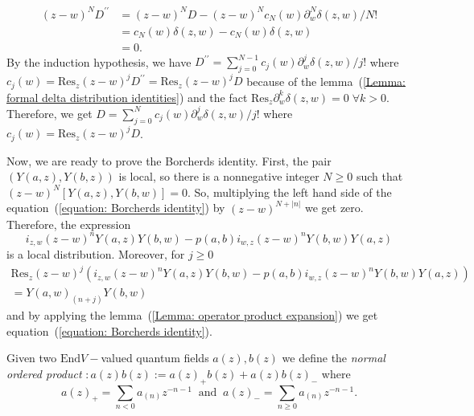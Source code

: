 \begin{equation}
\begin{split}
    (z-w)^ND^{\prime\prime} &= (z-w)^ND-(z-w)^N c_N(w)\partial_w^N\delta(z,w)/N!\\
    &=c_N(w)\delta(z,w)-c_N(w)\delta(z,w)\\
    &=0.
\end{split}
\end{equation}
By the induction hypothesis, we have $D^{\prime\prime}=\sum_{j=0}^{N-1}c_j(w)\partial_w^j\delta(z,w)/j!$ where $c_j(w)=\text{Res}_z(z-w)^jD^{\prime\prime} = \text{Res}_z(z-w)^jD$ because of the lemma~(\ref{Lemma: formal delta distribution identities}) and the fact $\text{Res}_z\partial_w^k\delta(z,w)=0\;\forall k>0$. Therefore, we get $D=\sum_{j=0}^Nc_j(w)\partial_w^j\delta(z,w)/j!$ where $c_j(w)=\text{Res}_z(z-w)^jD$.\par
Now, we are ready to prove the Borcherds identity. First, the pair $(Y(a,z),Y(b,z))$ is local, so there is a nonnegative integer $N\geq0$ such that $(z-w)^N[Y(a,z),Y(b,w)]=0$. So, multiplying the left hand side of the equation~(\ref{equation: Borcherds identity}) by $(z-w)^{N+|n|}$ we get zero. Therefore, the expression 
\begin{equation}
    i_{z,w}(z-w)^nY(a,z)Y(b,w)-p(a,b)i_{w,z}(z-w)^nY(b,w)Y(a,z)
\end{equation}
is a local distribution. Moreover, for $j\geq0$
\begin{equation}
\begin{split}
    \text{Res}_z(z-w)^j(i_{z,w}(z-w)^nY(a,z)Y(b,w)-p(a,b)i_{w,z}(z-w)^nY(b,w)Y(a,z))\\
    =Y(a,w)_{(n+j)}Y(b,w)
\end{split}
\end{equation}
and by applying the lemma~(\ref{Lemma: operator product expansion}) we get equation~(\ref{equation: Borcherds identity}).\par
\begin{dang}
    \begin{definition}\label{Definition: normal ordered product between fields}\cite{de2006finite}
        Given two $\text{End}V-$valued quantum fields $a(z), b(z)$ we define the \textit{normal ordered product} $:a(z)b(z):=a(z)_+b(z)+a(z)b(z)_-$ where 
        \begin{equation}
            a(z)_+=\sum_{n<0}a_{(n)}z^{-n-1}\;\;\text{and}\;\;a(z)_-=\sum_{n\geq0}a_{(n)}z^{-n-1}.
        \end{equation}
    \end{definition}
\end{dang}
